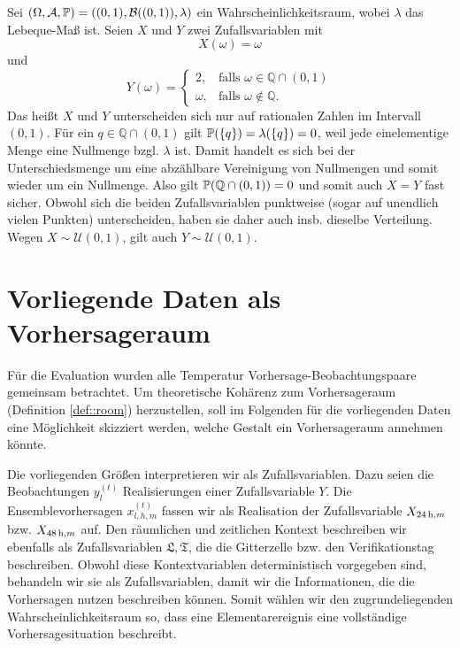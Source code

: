 \begin{bsp}
    Sei $(\Omega, \mathcal{A}, \mathbb{P}) = \left((0,1),\mathcal{B}((0,1)),\lambda \right)$ ein Wahrscheinlichkeitsraum, wobei $\lambda$ das Lebeque-Maß ist. Seien $X$ und $Y$ zwei Zufallsvariablen mit 
    \[
    X(\omega)=\omega
    \]
    und
    \[
    Y(\omega) = \begin{cases} 
            2,                     & \text{falls } \omega \in \mathbb{Q} \cap (0,1) \\
            \omega,                & \text{falls } \omega \notin  \mathbb{Q}.
        \end{cases}
    \]
    Das heißt $X$ und $Y$ unterscheiden sich nur auf rationalen Zahlen im Intervall $(0,1)$. Für ein $q \in \mathbb{Q} \cap (0,1)$  gilt $\mathbb{P}(\{q\})=\lambda(\{q\})=0$, weil jede einelementige Menge eine Nullmenge bzgl. $\lambda$ ist. Damit handelt es sich bei der Unterschiedsmenge um eine abzählbare Vereinigung von Nullmengen und somit wieder um ein Nullmenge. Also gilt $\mathbb{P}(\mathbb{Q} \cap (0,1))=0$ und somit auch $X=Y$ fast sicher.
    Obwohl sich die beiden Zufallsvariablen punktweise (sogar auf unendlich vielen Punkten) unterscheiden, haben sie daher auch insb. dieselbe Verteilung. Wegen $X \sim \mathcal{U}(0,1)$, gilt auch $Y \sim \mathcal{U}(0,1)$.
\end{bsp}




\chapter{Vorliegende Daten als Vorhersageraum}
Für die Evaluation wurden alle Temperatur Vorhersage-Beobachtungspaare gemeinsam betrachtet. Um theoretische Kohärenz zum Vorhersageraum (Definition \ref{def::room}) herzustellen, soll im Folgenden für die vorliegenden Daten eine Möglichkeit skizziert werden, welche Gestalt ein Vorhersageraum annehmen könnte.

Die vorliegenden Größen interpretieren wir als Zufallsvariablen. Dazu seien die Beobachtungen $y^{(t)}_l$ Realisierungen einer Zufallsvariable $Y$. Die Ensemblevorhersagen $x_{l,h,m}^{(t)}$ fassen wir als Realisation der Zufallsvariable $X_{24\,\mathrm{h},m}$ bzw. $X_{48\,\mathrm{h},m}$ auf. Den räumlichen und zeitlichen Kontext beschreiben wir ebenfalls als Zufallsvariablen $\mathfrak{L},\mathfrak{T}$, die die Gitterzelle bzw. den Verifikationstag beschreiben. Obwohl diese Kontextvariablen deterministisch vorgegeben sind, behandeln wir sie als Zufallsvariablen, damit wir die Informationen, die die Vorhersagen nutzen beschreiben können. Somit wählen wir den zugrundeliegenden Wahrscheinlichkeitsraum so, dass eine Elementarereignis eine vollständige Vorhersagesituation beschreibt.

